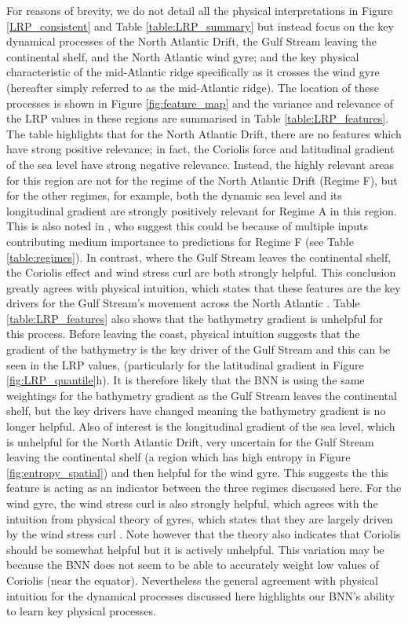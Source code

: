 \documentclass[a4paper]{article}
\begin{document}
For reasons of brevity, we do not detail all the physical interpretations in Figure \ref{LRP_consistent} and Table \ref{table:LRP_summary} but instead focus on the key dynamical processes of the North Atlantic Drift, the Gulf Stream leaving the continental shelf, and the North Atlantic wind gyre; and the key physical characteristic of the mid-Atlantic ridge specifically as it crosses the wind gyre (hereafter simply referred to as the mid-Atlantic ridge). The location of these processes is shown in Figure \ref{fig:feature_map} and the variance and relevance of the LRP values in these regions are summarised in Table \ref{table:LRP_features}. The table highlights that for the North Atlantic Drift, there are no features which have strong positive relevance; in fact, the Coriolis force and latitudinal gradient of the sea level have strong negative relevance.  Instead, the highly relevant areas for this region are not for the regime of the North Atlantic Drift (Regime F), but for the other regimes, for example, both the dynamic sea level and its longitudinal gradient are strongly positively relevant for Regime A in this region. This is also noted in \cite{THOR}, who suggest this could be because of multiple inputs contributing medium importance to predictions for Regime F (see Table \ref{table:regimes}). In contrast, where the Gulf Stream leaves the continental shelf, the Coriolis effect and wind stress curl are both strongly helpful. This conclusion greatly agrees with physical intuition, which states that these features are the key drivers for the Gulf Stream's movement across the North Atlantic \citep{webb2021introduction}. Table \ref{table:LRP_features} also shows that the bathymetry gradient is unhelpful for this process. Before leaving the coast, physical intuition suggests that the gradient of the bathymetry is the key driver of the Gulf Stream and this can be seen in the LRP values, (particularly for the latitudinal gradient in Figure \ref{fig:LRP_quantile}h). It is therefore likely that the BNN is using the same weightings for the bathymetry gradient as the Gulf Stream leaves the continental shelf, but the key drivers have changed meaning the bathymetry gradient is no longer helpful. Also of interest is the longitudinal gradient of the sea level, which is unhelpful for the North Atlantic Drift, very uncertain for the Gulf Stream leaving the continental shelf (a region which has high entropy in Figure \ref{fig:entropy_spatial}) and then helpful for the wind gyre. This suggests the this feature is acting as an indicator between the three regimes discussed here. For the wind gyre, the wind stress curl is also strongly helpful, which agrees with the intuition from physical theory of gyres, which states that they are largely driven by the wind stress curl \citep[see][]{munk1950wind}. Note however that the theory also indicates that Coriolis should be somewhat helpful but it is actively unhelpful. This variation may be because the BNN does not seem to be able to accurately weight low values of Coriolis (near the equator). Nevertheless the general agreement with physical intuition for the dynamical processes discussed here highlights our BNN's ability to learn key physical processes. 
\end{document}
